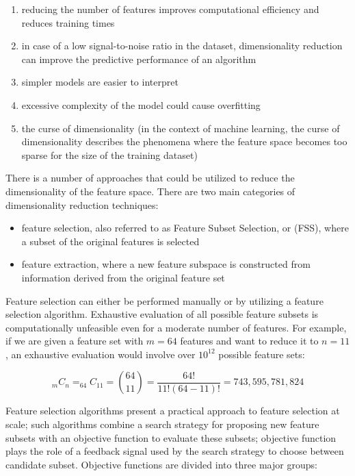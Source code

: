 \begin{enumerate}
    \item reducing the number of features improves computational efficiency and reduces training times
    \item in case of a low signal-to-noise ratio in the dataset, dimensionality reduction can improve the predictive performance of an algorithm\cite{RaschkaMirjalili2017}
    \item simpler models are easier to interpret\cite{James2013}
    \item excessive complexity of the model could cause overfitting\cite{RaschkaMirjalili2017}
    \item the curse of dimensionality\cite{Bellman1954} (in the context of machine learning, the curse of dimensionality describes the phenomena where the feature space becomes too sparse for the size of the training dataset)\cite{RaschkaMirjalili2017}
\end{enumerate}

There is a number of approaches that could be utilized to reduce the dimensionality of the feature space.
There are two main categories of dimensionality reduction techniques:
\begin{itemize}
    \item feature selection, also referred to as Feature Subset Selection, or (FSS), where a subset of the original features is selected
    \item feature extraction, where a new feature subspace is constructed from information derived from the original feature set
\end{itemize}

Feature selection can either be performed manually or by utilizing a feature selection algorithm.
Exhaustive evaluation of all possible feature subsets is computationally unfeasible even for a moderate number of features.
For example, if we are given a feature set with $m = 64$ features and want to reduce it to $n = 11$, an exhaustive evaluation would involve over $10^{12}$ possible feature sets:

\begin{equation}
    _{m}C_n = _{64}C_{11} = \binom{64} {11} = \frac{64!} {11!(64 - 11)!} = 743,595,781,824
\end{equation}

Feature selection algorithms present a practical approach to feature selection at scale;
such algorithms combine a search strategy for proposing new feature subsets with an objective function to evaluate these subsets;
objective function plays the role of a feedback signal used by the search strategy to choose between candidate subset.
Objective functions are divided into three major groups:

